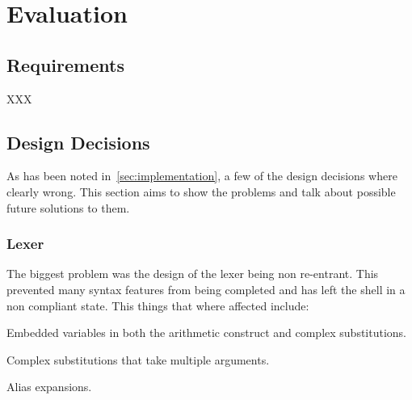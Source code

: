 \chapter{Evaluation}






\section{Requirements}
XXX


\section{Design Decisions}
As has been noted in~\ref{sec:implementation}, a few of the design decisions where clearly wrong. This section aims to show the problems and talk about possible future solutions to them.

\subsection{Lexer}
The biggest problem was the design of the lexer being non re-entrant.
This prevented many syntax features from being completed and has left the shell in a non compliant state.
This things that where affected include:
\begin{itemize*}
	\item Embedded variables in both the arithmetic construct and complex substitutions.
    \item Complex substitutions that take multiple arguments.
    \item Alias expansions.
\end{itemize*}

